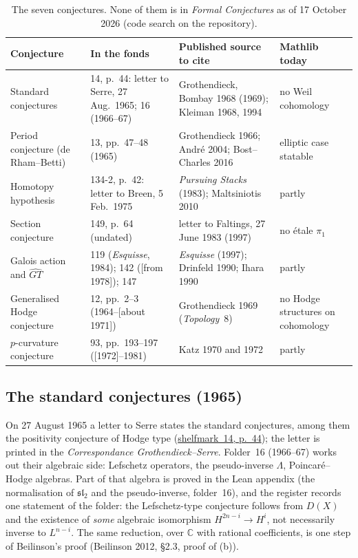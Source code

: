 \documentclass[11pt,a4paper]{article}
\newcommand{\lot}[3]{\href{https://grothendieck.commutator.io/\##1/#2}{shelfmark~#1, p.~#3}}
\begin{document}
\begin{table}[h]
\small
\begin{tabularx}{\textwidth}{>{\raggedright}p{2.7cm} >{\raggedright}p{3.2cm} >{\raggedright}X >{\raggedright\arraybackslash}p{2.6cm}}
\toprule
Conjecture & In the fonds & Published source to cite & Mathlib today \\
\midrule
Standard conjectures & 14, p.~44: letter to Serre, 27 Aug.\ 1965; 16 (1966--67) & Grothendieck, Bombay 1968 (1969); Kleiman 1968, 1994 & no Weil cohomology \\
Period conjecture (de Rham--Betti) & 13, pp.~47--48 (1965) & Grothendieck 1966; André 2004; Bost--Charles 2016 & elliptic case statable \\
Homotopy hypothesis & 134-2, p.~42: letter to Breen, 5 Feb.\ 1975 & \emph{Pursuing Stacks} (1983); Maltsiniotis 2010 & partly \\
Section conjecture & 149, p.~64 (undated) & letter to Faltings, 27 June 1983 (1997) & no étale $\pi_1$ \\
Galois action and $\widehat{GT}$ & 119 (\emph{Esquisse}, 1984); 142 ([from 1978]); 147 & \emph{Esquisse} (1997); Drinfeld 1990; Ihara 1990 & partly \\
Generalised Hodge conjecture & 12, pp.~2--3 (1964--[about 1971]) & Grothendieck 1969 (\emph{Topology}~8) & no Hodge structures on cohomology \\
$p$-curvature conjecture & 93, pp.~193--197 ([1972]--1981) & Katz 1970 and 1972 & partly \\
\bottomrule
\end{tabularx}
\caption{The seven conjectures. None of them is in \emph{Formal Conjectures} as of 17 October 2026 (code search on the repository).}
\label{tab:five}
\end{table}

\subsection{The standard conjectures (1965)}
On 27 August 1965 a letter to Serre states the standard conjectures, among
them the positivity conjecture of Hodge type (\lot{14}{3}{44}); the letter is
printed in the \emph{Correspondance Grothendieck--Serre}. Folder~16
(1966--67) works out their algebraic side: Lefschetz operators, the
pseudo-inverse $\Lambda$, Poincaré--Hodge algebras. Part of that algebra is
proved in the Lean appendix (the normalisation of $\mathfrak{sl}_2$ and the
pseudo-inverse, folder~16), and the register records one statement of the
folder: the Lefschetz-type conjecture follows from
$D(X)$ and the existence of \emph{some} algebraic isomorphism
$H^{2n-i} \to H^i$, not necessarily inverse to $L^{n-i}$. The same reduction,
over $\mathbb C$ with rational coefficients, is one step of Beilinson's proof
(Beilinson 2012, \S2.3, proof of (b)).
\end{document}
